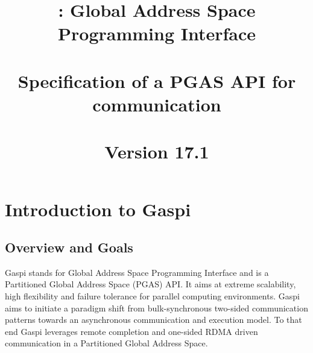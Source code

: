 \documentclass[a4paper]{article}
\title{\GASPI{}: Global Address Space Programming Interface\\
~\\
Specification of a PGAS API for communication\\
~\\
Version 17.1
}
\makeatletter
\newlength{\st}\setlength{\st}{0pt}
\newcommand{\GASPI}{{\sc Gaspi}}
\newcounter{counttodo}
\newlength{\savetabcolsep}
\newlength{\savearrayrulewidth}
\newenvironment{todo}
{\stepcounter{counttodo}
 \typeout{Environment TODO call \thecounttodo}
 \setlength{\savetabcolsep}{\tabcolsep}
 \setlength{\savearrayrulewidth}{\arrayrulewidth}
 \renewcommand{\tabcolsep}{0pt}
 \renewcommand{\arrayrulewidth}{2pt}
 \begin{center}
 \begin{tabular}{c|l@{\hspace*{2em}}|@{\hspace*{2em}}c}
 &
 \begin{minipage}{0.66\textwidth}
 \begin{itemize}
}
{\end{itemize}
 \end{minipage}
 &  todo \#\thecounttodo
 \end{tabular} \marginpar{$\Longleftarrow$}
 \end{center}
 \renewcommand{\tabcolsep}{\savetabcolsep}
 \renewcommand{\arrayrulewidth}{\savearrayrulewidth}
}
\makeatother
\begin{document}
\begin{titlepage}
\maketitle
\end{titlepage}

\tableofcontents


\newpage



\section{Introduction to \GASPI{}}
\label{sec::Intro}

\subsection{Overview and Goals}
\label{subsec::Overview}

\GASPI{} stands for Global Address Space Programming Interface and
is a Partitioned Global Address Space (PGAS) API. It aims at
extreme scalability, high flexibility and failure tolerance for parallel
computing environments.  \GASPI{} aims
to initiate a paradigm shift from bulk-synchronous two-sided
communication patterns towards an asynchronous communication and
execution model. To that end \GASPI{} leverages remote completion and 
one-sided RDMA driven communication in a Partitioned Global Address Space.
\end{document}
